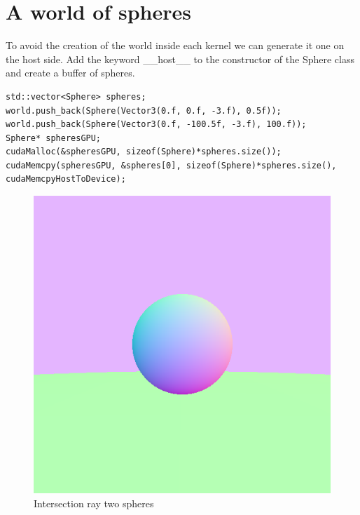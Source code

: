 \documentclass{article}
\begin{document}
\section{A world of spheres}
To avoid the creation of the world inside each kernel we can generate it one on the host side. Add the keyword \_\_host\_\_ to the constructor of the Sphere class and create a buffer of spheres. 
\begin{lstlisting}
std::vector<Sphere> spheres;
world.push_back(Sphere(Vector3(0.f, 0.f, -3.f), 0.5f));
world.push_back(Sphere(Vector3(0.f, -100.5f, -3.f), 100.f));
Sphere* spheresGPU;
cudaMalloc(&spheresGPU, sizeof(Sphere)*spheres.size());
cudaMemcpy(spheresGPU, &spheres[0], sizeof(Sphere)*spheres.size(), cudaMemcpyHostToDevice);
\end{lstlisting}
\begin{figure}[h]
	\centering
	\includegraphics[scale=0.6]{figures/intersectnormaltwosphere.png}
	\caption{Intersection ray two spheres}
\end{figure}

\newpage
\end{document}
